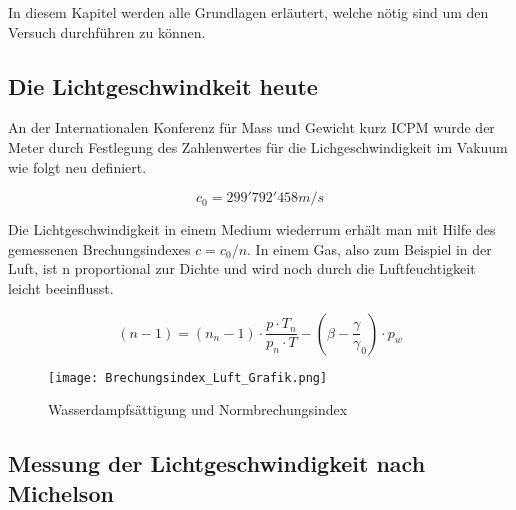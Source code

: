 In diesem Kapitel werden alle Grundlagen erläutert, welche nötig sind um den Versuch durchführen zu können. 
\subsection{Die Lichtgeschwindkeit heute}
An der Internationalen Konferenz für Mass und Gewicht kurz ICPM wurde der Meter durch Festlegung des Zahlenwertes für die Lichgeschwindigkeit im Vakuum wie folgt neu definiert.

\begin{equation*}
c_{0} = 299'792'458 m/s
\label{eq:Lichtgeschwindigkeit}
\end{equation*}

Die Lichtgeschwindigkeit in einem Medium wiederrum erhält man mit Hilfe des gemessenen Brechungsindexes $c=c_{0}/n$. In einem Gas, also zum Beispiel in der Luft, ist n proportional zur Dichte und wird noch durch die Luftfeuchtigkeit leicht beeinflusst.


\begin{equation}
(n - 1) = (n_{n} - 1)\cdot\dfrac{p \cdot T_{n}}{p_{n} \cdot T}-(\beta - \dfrac{\gamma}{\gamma}_{0}) \cdot p_{w}
\label{eq:Lichtgeschwindigkeit}
\end{equation}

\begin{figure}[htb]
\texttt{[image: Brechungsindex\_Luft\_Grafik.png]}
\caption{Wasserdampfsättigung und Normbrechungsindex}
\label{fig:Wasserdampfsättigung und Normbrechungsindex}
\end{figure}

\subsection{Messung der Lichtgeschwindigkeit nach Michelson}
